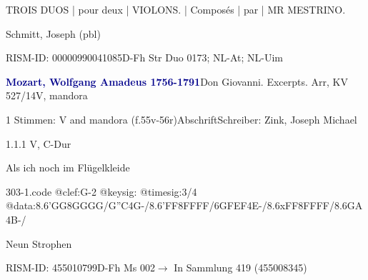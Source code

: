 \documentclass[twocolumn, 12pt]{book}
\begin{document}
\par \begin{itshape}TROIS DUOS | pour deux | VIOLONS. | Composés | par | MR MESTRINO.\end{itshape} \newline Schmitt, Joseph  (pbl)
\par RISM-ID: 00000990041085\newline D-Fh  Str Duo 0173; NL-At; NL-Uim
\par \vspace{16pt} \textcolor{darkblue}{\textbf{Mozart, Wolfgang Amadeus  1756-1791}}\hfillplus{\textbf{[303]}}\newline Don Giovanni. Excerpts. Arr, KV 527/14\newline V, mandora
\par \begin{itshape}\end{itshape} 
\par \textcolor{darkblue}{}  1 Stimmen: V and mandora  (f.55v-56r)\newline Abschrift\newline Schreiber: Zink, Joseph Michael
\par 1.1.1  V, C-Dur\newline \begin{footnotesize} Als ich noch im Flügelkleide \end{footnotesize}  
\begin{filecontents*}{303-1.code}
@clef:G-2
@keysig:
@timesig:3/4
@data:8.6'GG8GGGG/{G''C}4G-/8.6'FF8FFFF/{6GFEF}4E-/8.6xFF8FFFF/{8.6GA}4B-/
\end{filecontents*}
\newline %
\par Neun Strophen
\par RISM-ID: 455010799\newline D-Fh  Ms 002\newline $\rightarrow$ In Sammlung 419 (455008345)
      
\end{document}
